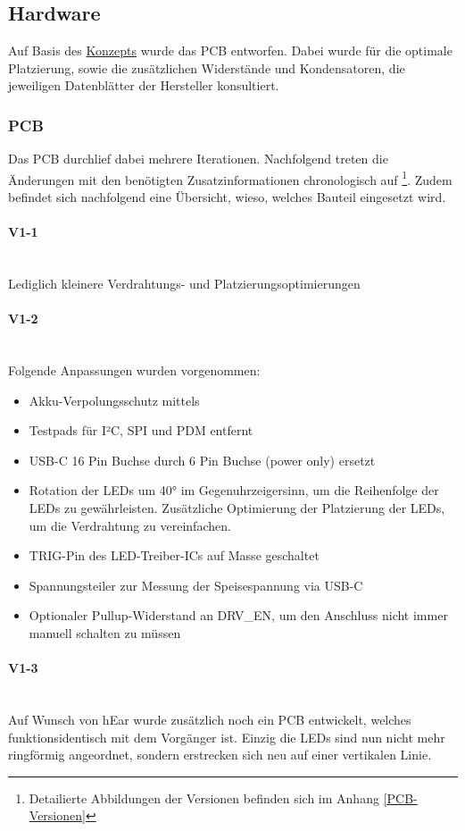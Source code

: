 \documentclass[12pt]{article}
\begin{document}
	\subsection{Hardware}
	Auf Basis des \hyperref[Konzept]{Konzepts} wurde das PCB entworfen. Dabei wurde für die optimale Platzierung, sowie die zusätzlichen Widerstände und Kondensatoren, die jeweiligen Datenblätter der Hersteller konsultiert.
	\subsubsection{PCB}
	Das PCB durchlief dabei mehrere Iterationen. Nachfolgend treten die Änderungen mit den benötigten Zusatzinformationen chronologisch auf \footnote{Detailierte Abbildungen der Versionen befinden sich im Anhang \ref{PCB-Versionen}}. Zudem befindet sich nachfolgend eine Übersicht, wieso, welches Bauteil eingesetzt wird.
	\paragraph{V1-1}\mbox{}\\
	Lediglich kleinere Verdrahtungs- und Platzierungsoptimierungen
	\paragraph{V1-2}\mbox{}\\
	Folgende Anpassungen wurden vorgenommen:
	\begin{itemize}
		\item Akku-Verpolungsschutz mittels 
		\item Testpads für I²C, SPI und PDM entfernt
		\item USB-C 16 Pin Buchse durch 6 Pin Buchse (power only) ersetzt
		\item Rotation der LEDs um 40° im Gegenuhrzeigersinn, um die Reihenfolge der LEDs zu gewährleisten. Zusätzliche Optimierung der Platzierung der LEDs, um die Verdrahtung zu vereinfachen.
		\item TRIG-Pin des LED-Treiber-ICs auf Masse geschaltet
		\item Spannungsteiler zur Messung der Speisespannung via USB-C
		\item Optionaler Pullup-Widerstand an DRV\_EN, um den Anschluss nicht immer manuell schalten zu müssen
	\end{itemize}
	\paragraph{V1-3}\mbox{}\\
	Auf Wunsch von hEar wurde zusätzlich noch ein PCB entwickelt, welches funktionsidentisch mit dem Vorgänger ist. Einzig die LEDs sind nun nicht mehr ringförmig angeordnet, sondern erstrecken sich neu auf einer vertikalen Linie.
\end{document}
